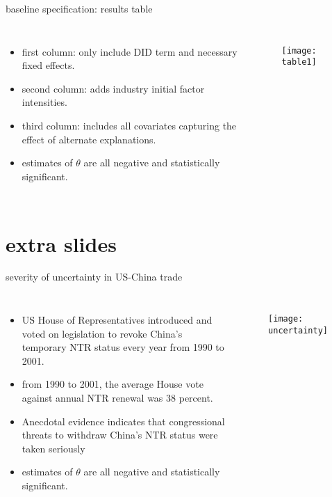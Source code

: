 \documentclass[10pt]{beamer}
\begin{document}
\begin{frame}{baseline specification: results table}
  \begin{columns}
\begin{itemize}
	\item first column: only include DID term and necessary fixed effects.
	\item second column: adds industry initial factor intensities.
	\item third column: includes all covariates capturing the effect of alternate explanations.
	\item estimates of $\theta$ are all negative and statistically significant.
\end{itemize}


 	\begin{figure}
 		\texttt{[image: table1]}	
 	\end{figure}

  \end{columns}
\end{frame}

\section{extra slides}

\begin{frame}{severity of uncertainty in US-China trade}
\label{uncertainty}
	  \begin{columns}
\begin{itemize}
	\item US House of Representatives introduced and voted on legislation to revoke China’s temporary NTR status every year from 1990 to 2001.
	\item from 1990 to 2001, the average House vote against annual NTR renewal was 38 percent.
	\item Anecdotal evidence indicates that congressional threats to withdraw China’s NTR status were taken seriously 
	\item estimates of $\theta$ are all negative and statistically significant.
\end{itemize}


 	\begin{figure}
 		\texttt{[image: uncertainty]}	
 	\end{figure}

  \end{columns}
\end{frame}
\end{document}
